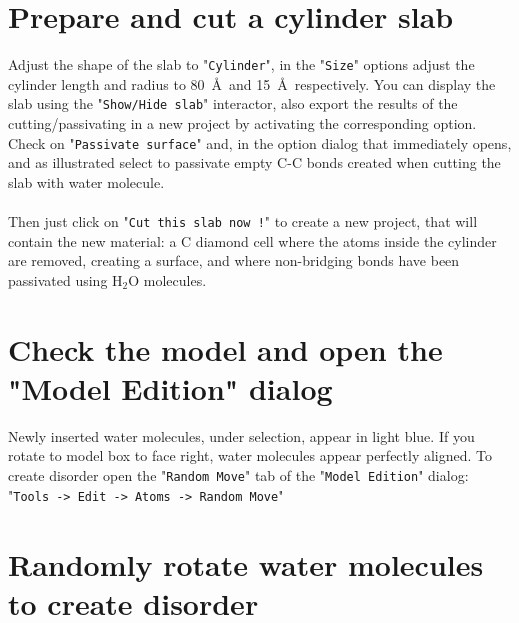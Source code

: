 \clearpage

\section{Prepare and cut a cylinder slab}

Adjust the shape of the slab to "\texttt{Cylinder}", in the "\texttt{Size}" options adjust the cylinder length and radius to 80~\AA\ and 15~\AA\ respectively. 
You can display the slab using the "\texttt{Show/Hide~slab}" interactor, also export the results of the cutting/passivating in a new project by activating the corresponding option. \\
Check on "\texttt{Passivate surface}" and, in the option dialog that immediately opens, and as illustrated select to passivate empty C-C bonds created when cutting the slab with water molecule. \\[0.5cm]
\\[0.5cm]
Then just click on "\texttt{Cut~this~slab~now~!}" to create a new project, that will contain the new material: a C diamond cell where the atoms inside the cylinder are removed, creating a surface, and where non-bridging bonds have been passivated using H$_2$O molecules.

\clearpage

\section{Check the model and open the "Model Edition" dialog}

Newly inserted water molecules, under selection, appear in light blue. If you rotate to model box to face right, water molecules appear perfectly aligned. 
To create disorder open the "\texttt{Random~Move}" tab of the "\texttt{Model~Edition}" dialog: "\texttt{Tools~->~Edit~->~Atoms~->~Random~Move}"\\[0.5cm] 

\clearpage

\section{Randomly rotate water molecules to create disorder}

